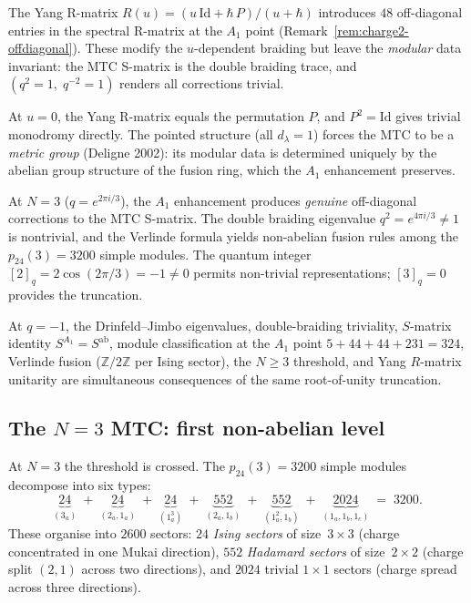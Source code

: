 \begin{remark}[The \texorpdfstring{$N = 2$}{N = 2} rigidity mechanism]
\label{rem:n2-rigidity-mechanism}
The Yang R-matrix $R(u) = (u\,\mathrm{Id} + \hbar\,P)/(u + \hbar)$
introduces $48$ off-diagonal entries in the spectral R-matrix at
the $A_1$ point (Remark~\ref{rem:charge2-offdiagonal}).
These modify the $u$-dependent braiding but leave the \emph{modular}
data invariant: the MTC S-matrix is the double braiding trace, and
$(q^2 = 1,\; q^{-2} = 1)$ renders all corrections trivial.

At $u = 0$, the Yang R-matrix equals the permutation $P$, and
$P^2 = \mathrm{Id}$ gives trivial monodromy directly.
The pointed structure (all $d_\lambda = 1$) forces the MTC to be
a \emph{metric group} (Deligne 2002): its modular data is
determined uniquely by the abelian group structure of the fusion ring,
which the $A_1$ enhancement preserves.
\end{remark}

\begin{conjecture}[Non-abelian threshold at \texorpdfstring{$N = 3$}{N = 3}]
\label{conj:n3-nonabelian-threshold}
\ClaimStatusConjectured
At $N = 3$ ($q = e^{2\pi i/3}$), the $A_1$ enhancement produces
\emph{genuine} off-diagonal corrections to the MTC S-matrix.
The double braiding eigenvalue $q^2 = e^{4\pi i/3} \neq 1$ is
nontrivial, and the Verlinde formula yields non-abelian fusion rules
among the $p_{24}(3) = 3200$ simple modules.
The quantum integer $[2]_q = 2\cos(2\pi/3) = -1 \neq 0$
permits non-trivial representations; $[3]_q = 0$ provides the
truncation.
\end{conjecture}
At \(q=-1\), the Drinfeld--Jimbo eigenvalues, double-braiding
triviality, \(S\)-matrix identity \(S^{A_1}=S^{\mathrm{ab}}\), module
classification at the \(A_1\) point
\(5+44+44+231=324\), Verlinde fusion
(\(\mathbb Z/2\mathbb Z\) per Ising sector), the \(N\geq3\) threshold,
and Yang \(R\)-matrix unitarity are simultaneous consequences of the
same root-of-unity truncation.

\subsection{The \texorpdfstring{$N = 3$}{N = 3} MTC: first non-abelian level}
\label{subsec:n3-mtc}

At $N = 3$ the threshold is crossed. The $p_{24}(3) = 3200$
simple modules decompose into six types:
\begin{equation}\label{eq:n3-module-types}
 \underbrace{24}_{(3_a)} \;+\;
 \underbrace{24}_{(2_a,1_a)} \;+\;
 \underbrace{24}_{(1_a^3)} \;+\;
 \underbrace{552}_{(2_a,1_b)} \;+\;
 \underbrace{552}_{(1_a^2,1_b)} \;+\;
 \underbrace{2024}_{(1_a,1_b,1_c)}
 \;=\; 3200.
\end{equation}
These organise into $2600$ sectors: $24$ \emph{Ising sectors} of
size~$3 \times 3$ (charge concentrated in one Mukai direction),
$552$ \emph{Hadamard sectors} of size~$2 \times 2$ (charge split
$(2,1)$ across two directions), and $2024$ trivial $1 \times 1$
sectors (charge spread across three directions).

